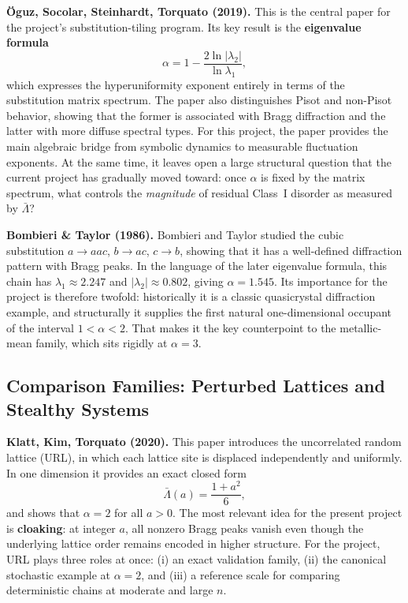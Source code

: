 \documentclass[11pt,letterpaper]{article}
\begin{document}
\vspace{0.4em}
\noindent\textbf{Öguz, Socolar, Steinhardt, Torquato (2019).}
This is the central paper for the project's substitution-tiling program.
Its key result is the \textbf{eigenvalue formula}
\[
  \alpha = 1 - \frac{2\ln|\lambda_2|}{\ln\lambda_1},
\]
which expresses the hyperuniformity exponent entirely in terms of the substitution
matrix spectrum.
The paper also distinguishes Pisot and non-Pisot behavior, showing that the former is
associated with Bragg diffraction and the latter with more diffuse spectral types.
For this project, the paper provides the main algebraic bridge from symbolic dynamics to
measurable fluctuation exponents.
At the same time, it leaves open a large structural question that the current project
has gradually moved toward: once $\alpha$ is fixed by the matrix spectrum, what controls
the \emph{magnitude} of residual Class~I disorder as measured by $\bar\Lambda$?

\vspace{0.4em}
\noindent\textbf{Bombieri \& Taylor (1986).}
Bombieri and Taylor studied the cubic substitution
$a\to aac$, $b\to ac$, $c\to b$, showing that it has a well-defined diffraction pattern
with Bragg peaks.
In the language of the later eigenvalue formula, this chain has
$\lambda_1 \approx 2.247$ and $|\lambda_2| \approx 0.802$, giving $\alpha = 1.545$.
Its importance for the project is therefore twofold: historically it is a classic
quasicrystal diffraction example, and structurally it supplies the first natural
one-dimensional occupant of the interval $1<\alpha<2$.
That makes it the key counterpoint to the metallic-mean family, which sits rigidly at
$\alpha = 3$.

\subsection{Comparison Families: Perturbed Lattices and Stealthy Systems}

\noindent\textbf{Klatt, Kim, Torquato (2020).}
This paper introduces the uncorrelated random lattice (URL), in which each lattice site
is displaced independently and uniformly.
In one dimension it provides an exact closed form
\[
  \bar\Lambda(a) = \frac{1+a^2}{6},
\]
and shows that $\alpha = 2$ for all $a>0$.
The most relevant idea for the present project is \textbf{cloaking}: at integer $a$,
all nonzero Bragg peaks vanish even though the underlying lattice order remains encoded
in higher structure.
For the project, URL plays three roles at once:
(i) an exact validation family, (ii) the canonical stochastic example at $\alpha = 2$,
and (iii) a reference scale for comparing deterministic chains at moderate and large $n$.
\end{document}
